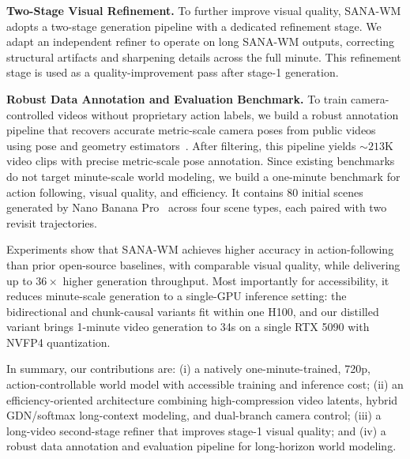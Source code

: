 \documentclass{llmxive}
\providecommand{\modelname}{SANA-WM\xspace}
\begin{document}
\noindent\textbf{Two-Stage Visual Refinement.}
To further improve visual quality, \modelname adopts a two-stage generation pipeline with a dedicated refinement stage.
We adapt an independent refiner
to operate on long \modelname outputs, correcting structural artifacts and sharpening details across the full minute.
This refinement stage is used as a quality-improvement pass after stage-1 generation.

\noindent\textbf{Robust Data Annotation and Evaluation Benchmark.}
To train camera-controlled videos without proprietary action labels, we build a robust annotation pipeline that recovers accurate metric-scale camera poses from public videos using pose and geometry estimators~\citep{vipe,pi3x,moge2}.
After filtering, this pipeline yields ${\sim}213$K video clips with precise metric-scale pose annotation.
Since existing benchmarks do not target minute-scale world modeling, we build a one-minute benchmark for action following, visual quality, and efficiency.
It contains 80 initial scenes generated by Nano Banana Pro~\citep{google2025nanobananapro} across four scene types, each paired with two revisit trajectories.

\noindent Experiments show that \modelname achieves higher accuracy in action-following than prior open-source baselines, with comparable visual quality, while delivering up to $36\times$ higher generation throughput.
Most importantly for accessibility, it reduces minute-scale generation to a single-GPU inference setting: the bidirectional and chunk-causal variants fit within one H100, and our distilled variant brings 1-minute video generation to 34s on a single RTX 5090 with NVFP4 quantization.

\noindent In summary, our contributions are: (i) a natively one-minute-trained, 720p, action-controllable world model with accessible training and inference cost; (ii) an efficiency-oriented architecture combining high-compression video latents, hybrid GDN/softmax long-context modeling, and dual-branch camera control; (iii) a long-video second-stage refiner that improves stage-1 visual quality; and (iv) a robust data annotation and evaluation pipeline for long-horizon world modeling.
\end{document}
